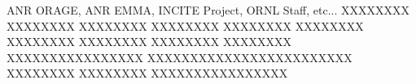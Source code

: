 \documentclass[twocolumn]{aastex61}
\begin{document}

 
 

\acknowledgments
ANR ORAGE, ANR EMMA, INCITE Project, ORNL Staff, etc...
XXXXXXXX XXXXXXXX XXXXXXXX XXXXXXXX XXXXXXXX XXXXXXXX XXXXXXXX XXXXXXXX XXXXXXXX XXXXXXXX XXXXXXXXXXXXXXXX XXXXXXXXXXXXXXXXXXXXXXXX XXXXXXXX XXXXXXXX XXXXXXXXXXXXXXXX 

\end{document}
